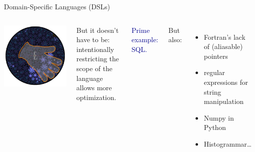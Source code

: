 \documentclass{beamer}
\begin{document}
\begin{frame}{Domain-Specific Languages (DSLs)}

\vspace{0.5 cm}
\begin{columns}
\includegraphics[width=\linewidth]{space-of-programs-glove.png}

But it doesn't have to be: intentionally restricting the scope of the language allows more optimization.

\vspace{0.25 cm}
\textcolor{darkblue}{Prime example: SQL.}

\vspace{0.25 cm}
But also:
\begin{itemize}
\item Fortran's lack of (aliasable) pointers
\item regular expressions for string manipulation
\item Numpy in Python
\item Histogrammar\ldots
\end{itemize}
\end{columns}
\end{frame}
\end{document}
